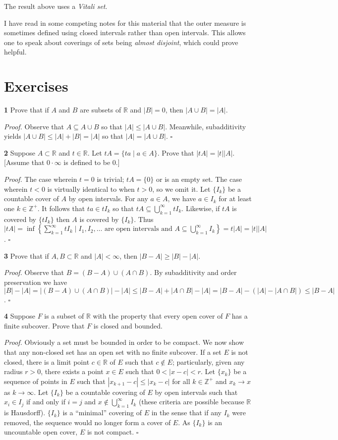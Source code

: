 \documentclass[a4paper]{article}
\newcommand{\R}{\mathbb{R}}
\newcommand{\Z}{\mathbb{Z}}
\begin{document}
The result above uses a \emph{Vitali set}.

I have read in some competing notes for this material that the outer measure is sometimes defined using closed intervals rather than open intervals. This allows one to speak about coverings of sets being \emph{almost disjoint}, which could prove helpful.

\section*{Exercises}

\textbf{1} Prove that if $A$ and $B$ are subsets of $\R$ and $|B| = 0$, then $|A \cup B| = |A|$.

\emph{Proof.} Observe that $A \subseteq A \cup B$ so that $|A| \leq |A \cup B|$. Meanwhile, subadditivity yields $|A \cup B| \leq |A| + |B| = |A|$ so that $|A| = |A \cup B|$. $\square$

\textbf{2} Suppose $A \subset \R$ and $t \in \R$. Let $tA = \{ta \mid a \in A\}$. Prove that $|tA| = |t||A|$. [Assume that $0 \cdot \infty$ is defined to be $0$.]

\emph{Proof.} The case wherein $t = 0$ is trivial; $tA = \{0\}$ or is an empty set. The case wherein $t < 0$ is virtually identical to when $t > 0$, so we omit it. Let $\{I_k\}$ be a countable cover of $A$ by open intervals. For any $a \in A$, we have $a \in I_k$ for at least one $k \in \Z^+$. It follows that $ta \in tI_k$ so that $tA \subseteq \bigcup_{k=1}^\infty tI_k$. Likewise, if $tA$ is covered by $\{tI_k\}$ then $A$ is covered by $\{I_k\}$. Thus $|tA| = \inf\left\{\sum_{k=1}^\infty tI_k \mid I_1, I_2, \ldots \text{ are open intervals and } A \subseteq \bigcup_{k=1}^\infty I_k\right\} = t|A| = |t||A|$. $\square$

\textbf{3} Prove that if $A, B \subset \R$ and $|A| < \infty$, then $|B - A| \geq |B| - |A|$.

\emph{Proof.} Observe that $B = (B - A) \cup (A \cap B)$. By subadditivity and order preservation we have $|B| - |A| = |(B - A) \cup (A \cap B)| - |A| \leq |B - A| + |A \cap B| - |A| = |B - A| - (|A| - |A \cap B|) \leq |B - A|$. $\square$

\textbf{4} Suppose $F$ is a subset of $\R$ with the property that every open cover of $F$ has a finite subcover. Prove that $F$ is closed and bounded.

\emph{Proof.} Obviously a set must be bounded in order to be compact. We now show that any non-closed set has an open set with no finite subcover. If a set $E$ is not closed, there is a limit point $c \in \R$ of $E$ such that $c \notin E$; particularly, given any radius $r > 0$, there exists a point $x \in E$ such that $0 < |x - c| < r$. Let $\{x_k\}$ be a sequence of points in $E$ such that $|x_{k+1} - c| \leq |x_k - c|$ for all $k \in \Z^+$ and $x_k \to x$ as $k \to \infty$. Let $\{I_k\}$ be a countable covering of $E$ by open intervals such that $x_i \in I_j$ if and only if $i = j$ and $x \notin \bigcup_{k=1}^\infty I_k$ (these criteria are possible because $\R$ is Hausdorff). $\{I_k\}$ is a ``minimal'' covering of $E$ in the sense that if any $I_k$ were removed, the sequence would no longer form a cover of $E$. As $\{I_k\}$ is an uncountable open cover, $E$ is not compact. $\square$
\end{document}
